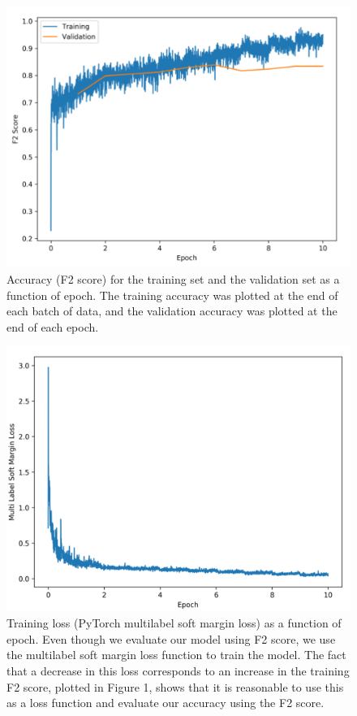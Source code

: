 \documentclass[10pt,twocolumn,letterpaper]{article}
\begin{document}
\begin{figure}
    \includegraphics[width=\columnwidth]{AccuracyCurve.png}
    \caption{Accuracy (F2 score) for the training set and the validation set as a function of epoch. The training accuracy was plotted at the end of each batch of data, and the validation accuracy was plotted at the end of each epoch.}
\end{figure}

\begin{figure}
\includegraphics[width=\columnwidth]{LossCurve.png}
    \caption{Training loss (PyTorch multilabel soft margin loss) as a function of epoch. Even though we evaluate our model using F2 score, we use the multilabel soft margin loss function to train the model. The fact that a decrease in this loss corresponds to an increase in the training F2 score, plotted in Figure 1, shows that it is reasonable to use this as a loss function and evaluate our accuracy using the F2 score.}
\end{figure}
\end{document}
